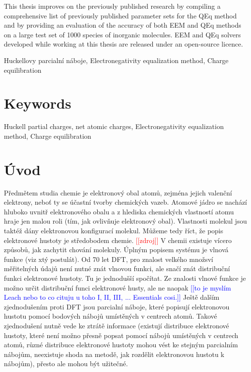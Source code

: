 \documentclass[10pt,draft,oneside]{fithesis2}
\newcommand\fixme[1]{\textcolor{red}{[[#1]]}}
\newcommand\todo[1]{\textcolor{blue}{[[#1]]}}
\begin{document}
\begin{ThesisAbstract}
This thesis improves on the previously published research by compiling a comprehensive list of previously published parameter sets for the QEq method and by providing an evaluation of the accuracy of both EEM and QEq methods on a large test set of 1000 species of inorganic molecules. EEM and QEq solvers developed while working at this thesis are released under an open-source licence.
\end{ThesisAbstract}

\begin{ThesisKeyWords}
Huckellovy parcialní náboje, Electronegativity equalization method, Charge equilibration

\begingroup
\let\clearpage\relax
{}
\chapter*{Keywords}
\endgroup

Huckell partial charges, net atomic charges, Electronegativity equalization method, Charge equilibration
\end{ThesisKeyWords}

\MainMatter


\tableofcontents

\chapter*{Úvod}

Předmětem studia chemie je elektronový obal atomů, zejména jejich valenční elektrony, neboť ty se účastní tvorby chemických vazeb. Atomové jádro se nachází hluboko uvnitř elektronového obalu a z hlediska chemických vlastností atomu hraje jen malou roli (tím, jak ovlivňuje elektronový obal). Vlastnosti molekul jsou taktéž dány elektronovou konfigurací molekul. Můžeme tedy říct, že popis elektronové hustoty je středobodem chemie. \fixme{zdroj} V chemii existuje vícero způsobů, jak zachytit chování molekuly. Úplným popisem systému je vlnová funkce (viz xtý postulát). Od 70 let DFT, pro znalost velkého množsví měřitelných údajů není nutné znát vlnovou funkci, ale snačí znát distribuční funkci elektronové hustoty. Tu je jednodušší spočítat. Ze znalosti vlnové funkce je možno určit distribuční funci elektronové husty, ale ne naopak \todo{to je myslím Leach nebo to co cituju u toho I, II, III, ... Essentials cosi.} Ještě dalším zjednodušením proti DFT jsou parcialní náboje, které popisují elektronovou hustotu pomocí bodových nábojů umístěných v centrech atomů. Takové zjednodušení nutně vede ke ztrátě informace (existují distribuce elektronové hustoty, které není možno přesně popsat pomocí nábojů umístěných v centrech atomů, různé distribuce elektronové hustoty mohou vést ke stejným parcialním nábojům, neexistuje shoda na metodě, jak rozdělit elektronovou hustotu k nábojům), přesto ale mohou být užitečné.
\end{document}
